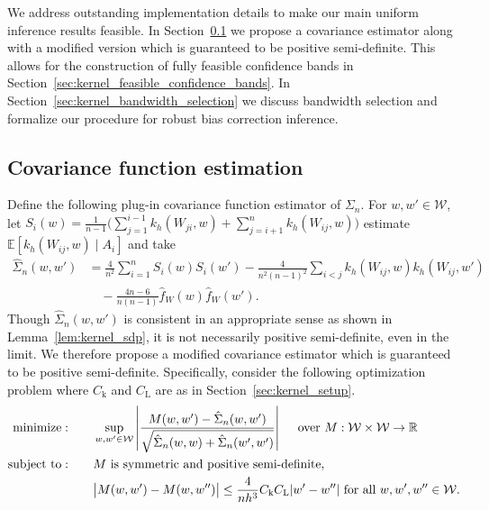 \documentclass[11pt,lof]{puthesis}
\newcommand{\R}{\ensuremath{\mathbb{R}}}
\newcommand{\E}{\ensuremath{\mathbb{E}}}
\newcommand{\rL}{\ensuremath{\mathrm{L}}}
\newcommand{\rk}{\ensuremath{\mathrm{k}}}
\newcommand{\cW}{\ensuremath{\mathcal{W}}}
\DeclareMathOperator*{\minimize}{minimize:}
\DeclareMathOperator*{\subjectto}{subject\ to:}
\theoremstyle{break}
\theoremstyle{proof}
\begin{document}
We address outstanding implementation details to make our main uniform
inference results feasible. In Section~\ref{sec:kernel_covariance_estimation} we
propose a covariance estimator along with a modified version which is
guaranteed to be positive semi-definite. This allows for the construction of
fully feasible confidence bands in
Section~\ref{sec:kernel_feasible_confidence_bands}.
In Section~\ref{sec:kernel_bandwidth_selection} we discuss bandwidth selection
and
formalize our procedure for robust bias correction inference.

\subsection{Covariance function estimation}
\label{sec:kernel_covariance_estimation}

Define the following plug-in covariance function
estimator of $\Sigma_n$. For $w, w' \in \cW$,
let $S_i(w) = \frac{1}{n-1} \big( \sum_{j = 1}^{i-1} k_h(W_{j i}, w)
+ \sum_{j = i+1}^n k_h(W_{i j}, w) \big)$
estimate $\E[k_h(W_{i j},w) \mid A_i]$ and take
%
\begin{align*}
\hat \Sigma_n(w,w')
&= \frac{4}{n^2} \sum_{i=1}^n S_i(w) S_i(w')
- \frac{4}{n^2(n-1)^2} \sum_{i<j} k_h(W_{i j},w) k_h(W_{i j},w') \\
&\quad- \frac{4n-6}{n(n-1)} \hat f_W(w) \hat f_W(w').
\end{align*}
%
Though $\hat\Sigma_n(w,w')$ is consistent in an appropriate sense as shown in
Lemma~\ref{lem:kernel_sdp}, it is not necessarily positive semi-definite, even
in the limit. We therefore propose a modified covariance estimator which is
guaranteed to be positive semi-definite. Specifically, consider the following
optimization problem where $C_\rk$ and $C_\rL$ are as in
Section~\ref{sec:kernel_setup}.
%
\begin{equation}
\label{eq:kernel_sdp}
\begin{aligned}
\minimize
\qquad
& \sup_{w,w' \in \cW}
\left|
\frac{M(w,w') - \hat\Sigma_n(w,w')}
{\sqrt{\hat \Sigma_n(w,w) + \hat \Sigma_n(w',w')}}
\right|
\quad \textup{ over } M: \cW \times \cW \to \R
\\
\subjectto
\qquad
& M \textup{ is symmetric and positive semi-definite}, \\
& \big|M(w,w') - M(w, w'')\big|
\leq \frac{4}{n h^3}
C_\rk C_\rL
|w'-w''|
\textup{ for all }
w, w', w'' \in \cW.
\end{aligned}
\end{equation}
\end{document}

